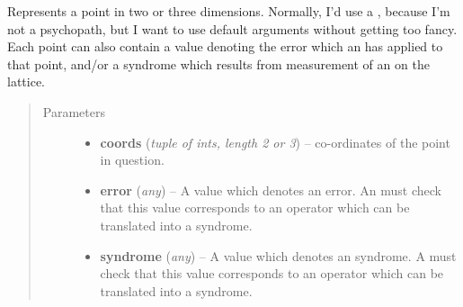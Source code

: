 \documentclass[letterpaper,10pt,english]{sphinxmanual}
\begin{document}
\begin{fulllineitems}
\label{lattice:py_qcode.Point}
Represents a point in two or three dimensions. Normally, I'd use a
, because I'm not a psychopath, but I want to use
default arguments without getting too fancy. Each point can also 
contain a value denoting the error which an 
 has applied to that point, and/or a
syndrome which results from measurement of an
 on the lattice.
\begin{quote}\begin{description}
\item[{Parameters}] \leavevmode\begin{itemize}
\item {} 
\textbf{coords} (\emph{tuple of ints, length 2 or 3}) -- co-ordinates of the point in question.

\item {} 
\textbf{error} (\emph{any}) -- A value which denotes an error. An  must check that this value corresponds to an operator which can be translated into a syndrome.

\item {} 
\textbf{syndrome} (\emph{any}) -- A value which denotes an syndrome. A  must check that this value corresponds to an operator which can be translated into a syndrome.

\end{itemize}

\end{description}\end{quote}

\end{fulllineitems}

\end{document}
